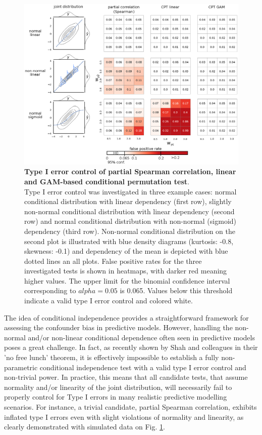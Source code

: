\documentclass{article}
\begin{document}
\begin{figure}[!b]
  \centering
  \includegraphics[width=0.75\paperwidth]{fig/sim_h0_demo.eps}
  \caption{\textbf{Type I error control of partial Spearman correlation, linear and GAM-based conditional permutation test}. \\
  Type I error control was investigated in three example cases: normal conditional distribution with linear dependency (first row), slightly non-normal conditional distribution with linear dependency (second row) and normal conditional distribution with non-normal (sigmoid) dependency (third row). Non-normal conditional distribution on the second plot is illustrated with blue density diagrams (kurtosis: -0.8, skewness: -0.1) and dependency of the mean is depicted with blue dotted lines an all plots. False positive rates for the three investigated tests is shown in heatmaps, with darker red meaning higher values. The upper limit for the binomial confidence interval corresponding to $alpha=0.05$ is 0.065. Values below this threshold indicate a valid type I error control and colored white.
  }
  \label{fig:sim-h0-demo}
\end{figure}

The idea of conditional independence provides a straightforward framework for assessing the confounder bias in predictive models. However, handling the non-normal and/or non-linear conditional dependence often seen in predictive models \citep{garcia2009study, kristensen2017whole} poses a great challenge.
In fact, as recently shown by Shah and colleagues \cite{shah2020hardness} in their 'no free lunch' theorem, it is effectively impossible to establish a fully non-parametric conditional independence test with a valid type I error control and non-trivial power. In practice, this means that all candidate tests, that assume normality and/or linearity of the joint distribution, will necessarily fail to properly control for Type I errors in many realistic predictive modelling scenarios. For instance, a trivial candidate, partial Spearman correlation, exhibits inflated type I errors even with slight violations of normality and linearity, as clearly demonstrated with simulated data on Fig. \ref{fig:sim-h0-demo}.
\end{document}

